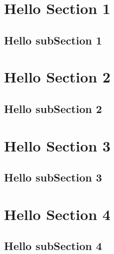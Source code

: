 \section{Hello Section 1}
\subsection{Hello subSection 1}
\section{Hello Section 2}
\subsection{Hello subSection 2}
\section{Hello Section 3}
\subsection{Hello subSection 3}
\section{Hello Section 4}
\subsection{Hello subSection 4}
